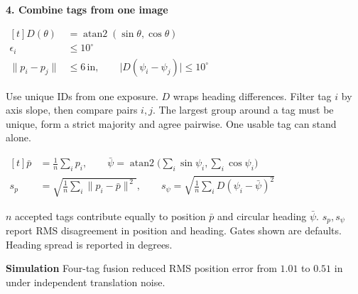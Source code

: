 \documentclass[10pt,border=0pt]{standalone}
\newlength{\panelwidth}
\DeclareMathOperator{\atanTwo}{atan2}
\newcommand{\vabs}[1]{\lvert #1\rvert}
\newcommand{\vnorm}[1]{\lVert #1\rVert}
\newcommand{\steptitle}[1]{{\fontsize{12}{14}\selectfont\bfseries #1\par}\vspace{1.5mm}}
\newcommand{\legendfont}{\fontsize{9}{11.4}\selectfont}
\begin{document}
{{\begin{minipage}{\panelwidth}
\steptitle{4. Combine tags from one image}
\begin{minipage}[t]{0.475\linewidth}
\raggedright
\(\begin{aligned}[t]
D(\theta)&=\atanTwo(\sin\theta,\cos\theta)\\
\epsilon_i&\le 10^\circ\\
\vnorm{p_i-p_j}&\le 6\,\mathrm{in},\qquad \vabs{D(\psi_i-\psi_j)}\le 10^\circ
\end{aligned}\)\par
\vspace{1.6mm}
\legendfont
Use unique IDs from one exposure. \(D\) wraps heading differences.
Filter tag \(i\) by axis slope, then compare pairs \(i,j\).
The largest group around a tag must be unique, form a strict majority
and agree pairwise. One usable tag can stand alone.\par
\end{minipage}\hfill
%
\begin{minipage}[t]{0.49\linewidth}
\raggedright
\(\begin{aligned}[t]
\bar p&=\tfrac1n\sum\nolimits_i p_i,\qquad
\bar\psi=\atanTwo\!\big(\sum\nolimits_i\sin\psi_i,\sum\nolimits_i\cos\psi_i\big)\\
s_p&=\sqrt{\tfrac1n\sum\nolimits_i\vnorm{p_i-\bar p}^{\,2}},\qquad
s_\psi=\sqrt{\tfrac1n\sum\nolimits_i D(\psi_i-\bar\psi)^2}
\end{aligned}\)\par
\vspace{1.6mm}
\legendfont
\(n\) accepted tags contribute equally to position \(\bar p\) and
circular heading \(\bar\psi\). \(s_p,s_\psi\) report RMS disagreement
in position and heading. Gates shown are defaults. Heading spread is reported in degrees.\par
\end{minipage}\par
\vspace{2mm}
{\legendfont\textbf{\textcolor{frog}{Simulation}}
\enspace Four-tag fusion reduced RMS position error from \(1.01\) to \(0.51\) in
under independent translation noise.\par}
\end{minipage}%
}%
}%
%
\ifdim\dimexpr\ht\portfolioPanel+\dp\portfolioPanel\relax>148.5mm
  \PackageError{hive-panel}{Panel taller than half an A4 page}{Reduce the content or spacing.}
\fi%
\usebox{\portfolioPanel}%
\end{document}
